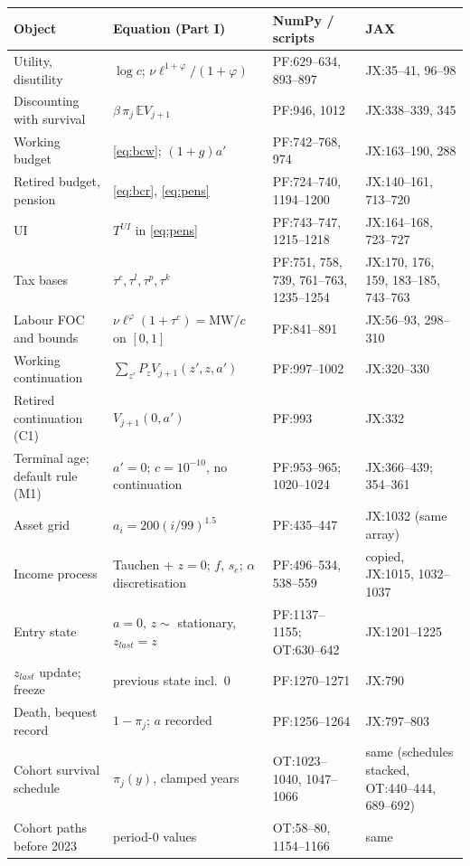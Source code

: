 \documentclass[11pt,a4paper]{article}
\begin{document}
\footnotesize
\begin{longtable}{@{}p{3.6cm}p{5.3cm}p{3.6cm}p{3.6cm}@{}}
\toprule
Object & Equation (Part I) & NumPy / scripts & JAX \\
\midrule
\endhead
Utility, disutility & $\log c$; $\nu \ell^{1+\varphi}/(1+\varphi)$ & PF:629--634, 893--897 & JX:35--41, 96--98 \\
Discounting with survival & $\beta\,\pi_j\,\mathbb{E}V_{j+1}$ & PF:946, 1012 & JX:338--339, 345 \\
Working budget & \eqref{eq:bcw}; $(1+g)a'$ & PF:742--768, 974 & JX:163--190, 288 \\
Retired budget, pension & \eqref{eq:bcr}, \eqref{eq:pens} & PF:724--740, 1194--1200 & JX:140--161, 713--720 \\
UI & $T^{UI}$ in \eqref{eq:pens} & PF:743--747, 1215--1218 & JX:164--168, 723--727 \\
Tax bases & $\tau^c, \tau^l, \tau^p, \tau^k$ & PF:751, 758, 739, 761--763, 1235--1254 & JX:170, 176, 159, 183--185, 743--763 \\
Labour FOC and bounds & $\nu\ell^{\varphi}(1+\tau^c) = \mathrm{MW}/c$ on $[0,1]$ & PF:841--891 & JX:56--93, 298--310 \\
Working continuation & $\sum_{z'} P_z V_{j+1}(z', z, a')$ & PF:997--1002 & JX:320--330 \\
Retired continuation (C1) & $V_{j+1}(0, a')$ & PF:993 & JX:332 \\
Terminal age; default rule (M1) & $a' = 0$; $c = 10^{-10}$, no continuation & PF:953--965; 1020--1024 & JX:366--439; 354--361 \\
Asset grid & $a_i = 200(i/99)^{1.5}$ & PF:435--447 & JX:1032 (same array) \\
Income process & Tauchen + $z = 0$; $f$, $s_e$; $\alpha$ discretisation & PF:496--534, 538--559 & copied, JX:1015, 1032--1037 \\
Entry state & $a = 0$, $z \sim$ stationary, $z_{last} = z$ & PF:1137--1155; OT:630--642 & JX:1201--1225 \\
$z_{last}$ update; freeze & previous state incl.\ 0 & PF:1270--1271 & JX:790 \\
Death, bequest record & $1 - \pi_j$; $a$ recorded & PF:1256--1264 & JX:797--803 \\
Cohort survival schedule & $\pi_j(y)$, clamped years & OT:1023--1040, 1047--1066 & same (schedules stacked, OT:440--444, 689--692) \\
Cohort paths before 2023 & period-0 values & OT:58--80, 1154--1166 & same \\

\end{longtable}
\end{document}
